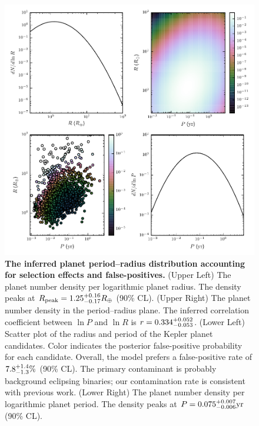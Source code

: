 \documentclass{nature}
\newcommand{\Rpeak}{R_\mathrm{peak}}
\newcommand{\REarth}{R_\oplus}
\begin{document}
\begin{figure}
  \includegraphics[width=\columnwidth]{foreground-dist}
  \caption{\label{fig:foreground-dist} \textbf{The inferred planet
      period--radius distribution accounting for selection effects and
      false-positives.}  (Upper Left) The planet number density per
    logarithmic planet radius.  The density peaks at $\Rpeak =
    \rpeakrange \REarth$ (90\% CL).  (Upper Right) The planet number
    density in the period--radius plane.  The inferred correlation
    coefficient between $\ln P$ and $\ln R$ is $r = 0.334_{-0.053}^{+0.052}$.
    (Lower Left) Scatter plot of the radius and period of the Kepler
    planet candidates.  Color indicates the posterior false-positive
    probability for each candidate.  Overall, the model prefers a
    false-positive rate of $7.8_{-1.3}^{+1.4}\%$ (90\% CL).  The primary
    contaminant is probably background eclipsing binaries; our
    contamination rate is consistent with previous
    work\cite{Fressin2013}. (Lower Right) The planet number density
    per logarithmic planet period.  The density peaks at $P =
    0.075_{-0.006}^{+0.007} \mathrm{yr}$ (90\% CL). }
\end{figure}
\end{document}

